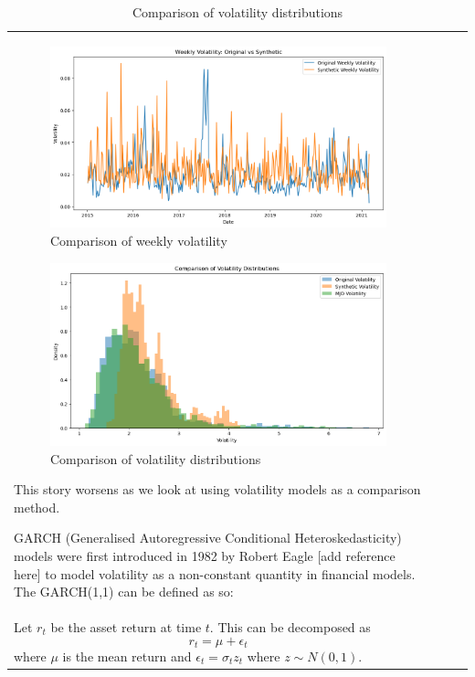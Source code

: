 \documentclass[12pt]{article}
\newcommand{\newp}
    {
    \vskip 0.5cm 
  }
\numberwithin{equation}{section}
\begin{document}
\begin{table}[h!]
\begin{tabular}{|l|c|c|c|}
\begin{figure}[h!]
    \begin{minipage}{0.48\textwidth}
        \centering
        \includegraphics[width=\linewidth]{weeklyvol.png}
        \caption{Comparison of weekly volatility}
        \label{fig:weeklyvol}
    \end{minipage}
\end{figure}
\begin{figure}[h!]
  \centering 
  \includegraphics[scale=0.35]{voldist2.png}
  \caption{Comparison of volatility distributions}
  \label{fig:voldist2}
\end{figure}
This story worsens as we look at using volatility models as a comparison method. 
\newp
GARCH (Generalised Autoregressive Conditional Heteroskedasticity) models were 
first introduced in 1982 by Robert Eagle [add reference here] to model volatility 
as a non-constant quantity in financial models. The GARCH(1,1) can be defined as 
so:\\ 
Let $r_t$ be the asset return at time $t$. This can be decomposed as 
\begin{equation}
r_t = \mu + \epsilon_t
\end{equation}
where $\mu$ is the mean return and $\epsilon_t = \sigma_t z_t$ where $z \sim N(0,1)$. 

\end{tabular}
\end{table}
\end{document}
